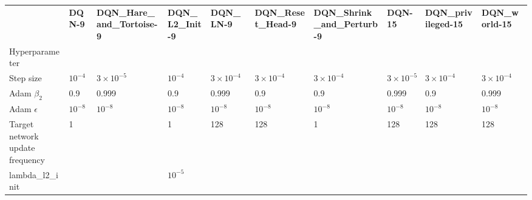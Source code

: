 \begin{tabular}{llllllllll}
 & \bfseries DQN-9 & \bfseries DQN_Hare_and_Tortoise-9 & \bfseries DQN_L2_Init-9 & \bfseries DQN_LN-9 & \bfseries DQN_Reset_Head-9 & \bfseries DQN_Shrink_and_Perturb-9 & \bfseries DQN-15 & \bfseries DQN_privileged-15 & \bfseries DQN_world-15 \\
Hyperparameter &  &  &  &  &  &  &  &  &  \\
Step size & $10^{-4}$ & $3 \times 10^{-5}$ & $10^{-4}$ & $3 \times 10^{-4}$ & $3 \times 10^{-4}$ & $3 \times 10^{-4}$ & $3 \times 10^{-5}$ & $3 \times 10^{-4}$ & $3 \times 10^{-4}$ \\
Adam $\beta_2$ & 0.9 & 0.999 & 0.9 & 0.999 & 0.9 & 0.9 & 0.999 & 0.9 & 0.999 \\
Adam $\epsilon$ & $10^{-8}$ & $10^{-8}$ & $10^{-8}$ & $10^{-8}$ & $10^{-8}$ & $10^{-8}$ & $10^{-8}$ & $10^{-8}$ & $10^{-8}$ \\
Target network update frequency & 1 &  & 1 & 128 & 128 & 1 & 128 & 128 & 128 \\
lambda_l2_init &  &  & $10^{-5}$ &  &  &  &  &  &  \\
\end{tabular}
